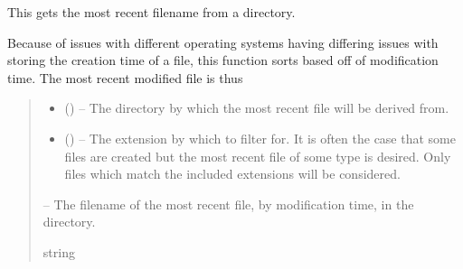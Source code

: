 \documentclass[letterpaper,11pt,english]{sphinxmanual}
\begin{document}
\begin{savenotes}\begin{fulllineitems}
\label{\detokenize{code/opihiexarata.library.path:opihiexarata.library.path.get_most_recent_filename_in_directory}}
\pysigstartsignatures
{}
\pysigstopsignatures
\sphinxAtStartPar
This gets the most recent filename from a directory.

\sphinxAtStartPar
Because of issues with different operating systems having differing
issues with storing the creation time of a file, this function sorts based
off of modification time. The most recent modified file is thus
\begin{quote}\begin{description}
\begin{itemize}
\item {} 
\sphinxAtStartPar
{} () – The directory by which the most recent file will be derived from.

\item {} 
\sphinxAtStartPar
{} () – The extension by which to filter for. It is often the case that some
files are created but the most recent file of some type is desired.
Only files which match the included extensions will be considered.

\end{itemize}

\sphinxAtStartPar
{} – The filename of the most recent file, by modification time, in the
directory.

\sphinxAtStartPar
string

\end{description}\end{quote}

\end{fulllineitems}\end{savenotes}
\end{document}
